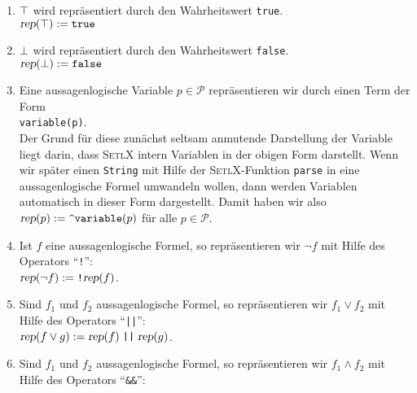 \begin{enumerate}
\item $\top$ wird repr\"{a}sentiert durch den Wahrheitswert \texttt{true}.
      \\[0.2cm]
      \hspace*{1.3cm}
      $\textsl{rep}(\top) := \mathtt{true}$
\item $\bot$  wird repr\"{a}sentiert durch den Wahrheitswert \texttt{false}.
      \\[0.2cm]
      \hspace*{1.3cm}
      $\textsl{rep}(\bot) := \mathtt{false}$
\item Eine aussagenlogische Variable $p \in \mathcal{P}$ repr\"{a}sentieren wir 
      durch einen Term der Form
      \\[0.2cm]
      \hspace*{1.3cm}
      \texttt{variable(p)}.
      \\[0.2cm]
      Der Grund f\"{u}r diese zun\"{a}chst seltsam anmutende Darstellung der Variable liegt darin,
      dass \textsc{SetlX} intern Variablen in der obigen Form darstellt.  Wenn wir sp\"{a}ter
      einen \texttt{String} mit Hilfe der \textsc{SetlX}-Funktion \texttt{parse} in eine
      aussagenlogische Formel umwandeln wollen, dann werden Variablen automatisch in dieser Form
      dargestellt. Damit haben wir also
      \\[0.2cm]
      \hspace*{1.3cm}
      $\textsl{rep}(p) := \texttt{\symbol{94}variable}(p)$ \quad f\"{u}r alle $p \in \mathcal{P}$.
\item Ist $f$ eine aussagenlogische Formel, so repr\"{a}sentieren wir $\neg f$ mit Hilfe des Operators
      ``\texttt{!}'': \\[0.2cm]
      \hspace*{1.3cm} 
      $\textsl{rep}(\neg f) := \texttt{!} \textsl{rep}(f)$.
\item Sind $f_1$ und $f_2$ aussagenlogische Formel, so repr\"{a}sentieren wir $f_1 \vee f_2$ mit
      Hilfe des Operators  ``\texttt{||}'': \\[0.2cm]
      \hspace*{1.3cm} 
      $\textsl{rep}(f \vee g) := \textsl{rep}(f) \;\texttt{||}\; \textsl{rep}(g)$.
\item Sind $f_1$ und $f_2$ aussagenlogische Formel, so repr\"{a}sentieren wir $f_1 \wedge f_2$ mit
      Hilfe des Operators ``\texttt{\&\&}'': \\[0.2cm]
      \hspace*{1.3cm} 

\end{enumerate}
